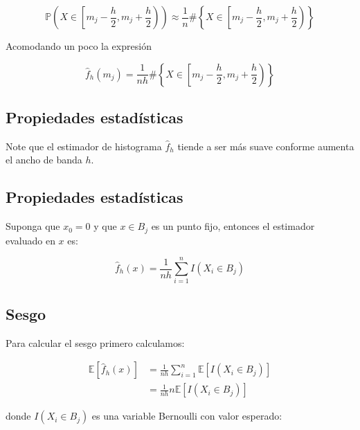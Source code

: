 \documentclass[
  12pt,
]{book}
\begin{document}
\begin{equation*}
    \mathbb{P} \left(X\in \left[m_j - \frac{h}{2},m_j + \frac{h}{2}\right) \right)  \approx   \frac{1}{n} \#
    \left\{X\in \left[m_j - \frac{h}{2},m_j + \frac{h}{2}\right) \right\}
\end{equation*}

Acomodando un poco la expresión

\begin{equation*}
\hat{f}_h(m_j) =  \frac{1}{nh} \#
\left\{X\in \left[m_j - \frac{h}{2},m_j + \frac{h}{2}\right) \right\}
\end{equation*}

\hypertarget{propiedades-estaduxedsticas}{%
\subsection{Propiedades
estadísticas}\label{propiedades-estaduxedsticas}}

Note que el estimador de histograma \(\hat f_h\) tiende a ser más suave
conforme aumenta el ancho de banda \(h\).

\hypertarget{propiedades-estaduxedsticas-1}{%
\subsection{Propiedades
estadísticas}\label{propiedades-estaduxedsticas-1}}

Suponga que \(x_0 = 0\) y que \(x \in B_j\) es un punto fijo, entonces
el estimador evaluado en \(x\) es:

\begin{equation*}
\hat{f}_h(x) =  \frac{1}{nh} \sum_{i = 1}^{n} I(X_i \in B_j)
\end{equation*}

\hypertarget{sesgo}{%
\subsection{Sesgo}\label{sesgo}}

Para calcular el sesgo primero calculamos:

\begin{align*}
\mathbb{E}\left[ \hat{f}_h(x)\right]
& =  \frac{1}{nh} \sum_{i = 1}^{n} \mathbb{E}\left[ I(X_i \in B_j)\right] \\
& = \frac{1}{nh} n \mathbb{E}\left[ I(X_i \in B_j)\right]
\end{align*}

donde \(I(X_i \in B_j)\) es una variable Bernoulli con valor esperado:
\end{document}
